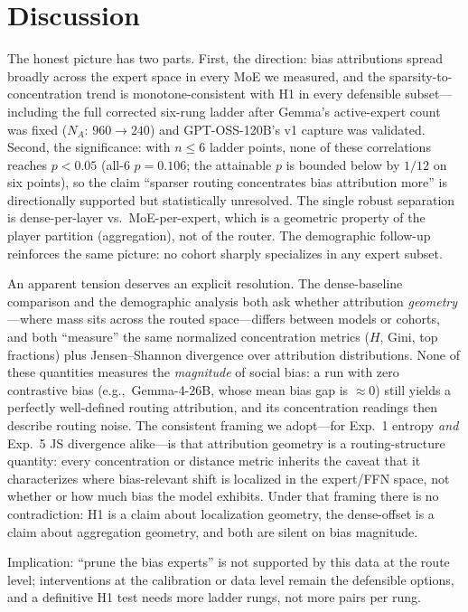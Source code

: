 \documentclass[sigconf]{acmart}
\begin{document}
\section{Discussion}
The honest picture has two parts. First, the direction: bias attributions
spread broadly across the expert space in every MoE we measured, and the
sparsity-to-concentration trend is monotone-consistent with H1 in every
defensible subset---including the full corrected six-rung ladder after
Gemma's active-expert count was fixed ($N_A$: $960 \rightarrow 240$) and
GPT-OSS-120B's v1 capture was validated. Second, the significance: with
$n \le 6$ ladder points, none of these correlations reaches $p < 0.05$
(all-6 $p = 0.106$; the attainable $p$ is bounded below by $1/12$ on six
points), so the claim ``sparser routing concentrates bias attribution
more'' is directionally supported but statistically unresolved. The single
robust separation is dense-per-layer vs.\ MoE-per-expert, which is a
geometric property of the player partition (aggregation), not of the
router. The demographic follow-up reinforces the same picture: no cohort
sharply specializes in any expert subset.

An apparent tension deserves an explicit resolution. The dense-baseline
comparison and the demographic analysis both ask whether attribution
\emph{geometry}---where mass sits across the routed space---differs
between models or cohorts, and both ``measure'' the same normalized
concentration metrics ($H$, Gini, top fractions) plus Jensen--Shannon
divergence over attribution distributions. None of these quantities
measures the \emph{magnitude} of social bias: a run with zero contrastive
bias (e.g.,\ Gemma-4-26B, whose mean bias gap is $\approx 0$) still yields a
perfectly well-defined routing attribution, and its concentration readings
then describe routing noise. The consistent framing we adopt---for
Exp.~1 entropy \emph{and} Exp.~5 JS divergence alike---is that attribution
geometry is a routing-structure quantity: every concentration or distance
metric inherits the caveat that it characterizes where bias-relevant shift
is localized in the expert/FFN space, not whether or how much bias the
model exhibits. Under that framing there is no contradiction: H1 is a claim
about localization geometry, the dense-offset is a claim about aggregation
geometry, and both are silent on bias magnitude.

Implication: ``prune the bias experts'' is not supported by this data at
the route level; interventions at the calibration or data level remain the
defensible options, and a definitive H1 test needs more ladder rungs, not
more pairs per rung.
\end{document}
